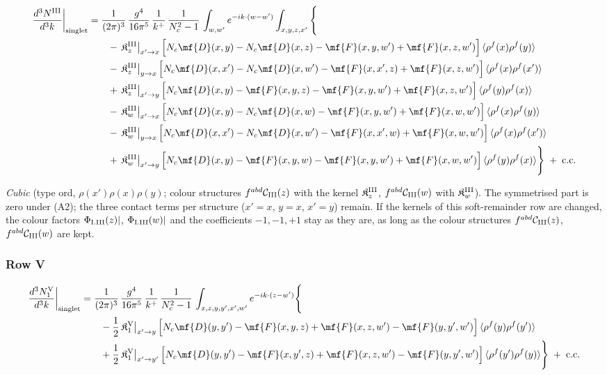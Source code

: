 \begin{align}
\frac{d^{3}N^{\rm III}}{d^{3}k}\bigg|_{\rm singlet}&=\frac{1}{(2\pi)^{3}}\,\frac{g^{4}}{16\pi^{5}}\,\frac{1}{k^{+}}\,\frac{1}{N_{c}^{2}-1}\,\int_{w,w'}e^{-ik\cdot(w-w')}\int_{x,y,z,x'}\Bigg\{\notag\\
&\qquad -\,\mathfrak{K}^{\rm III}_{z}\big|_{x'\to x}\,\Big[N_{c}\mf{D}(x,y)-N_{c}\mf{D}(x,z)-\mf{F}(x,y,w')+\mf{F}(x,z,w')\Big]\,\langle\rho^{f}(x)\rho^{f}(y)\rangle\notag\\
&\qquad -\,\mathfrak{K}^{\rm III}_{z}\big|_{y\to x}\,\Big[N_{c}\mf{D}(x,x')-N_{c}\mf{D}(x,w')-\mf{F}(x,x',z)+\mf{F}(x,z,w')\Big]\,\langle\rho^{f}(x)\rho^{f}(x')\rangle\notag\\
&\qquad +\,\mathfrak{K}^{\rm III}_{z}\big|_{x'\to y}\,\Big[N_{c}\mf{D}(x,y)-\mf{F}(x,y,z)-\mf{F}(x,y,w')+\mf{F}(x,z,w')\Big]\,\langle\rho^{f}(y)\rho^{f}(x)\rangle\notag\\
&\qquad -\,\mathfrak{K}^{\rm III}_{w}\big|_{x'\to x}\,\Big[N_{c}\mf{D}(x,y)-N_{c}\mf{D}(x,w)-\mf{F}(x,y,w')+\mf{F}(x,w,w')\Big]\,\langle\rho^{f}(x)\rho^{f}(y)\rangle\notag\\
&\qquad -\,\mathfrak{K}^{\rm III}_{w}\big|_{y\to x}\,\Big[N_{c}\mf{D}(x,x')-N_{c}\mf{D}(x,w')-\mf{F}(x,x',w)+\mf{F}(x,w,w')\Big]\,\langle\rho^{f}(x)\rho^{f}(x')\rangle\notag\\
&\qquad +\,\mathfrak{K}^{\rm III}_{w}\big|_{x'\to y}\,\Big[N_{c}\mf{D}(x,y)-\mf{F}(x,y,w)-\mf{F}(x,y,w')+\mf{F}(x,w,w')\Big]\,\langle\rho^{f}(y)\rho^{f}(x)\rangle\Bigg\}\;+\;{\rm c.c.}\label{eq:s-I-III}
\end{align}

\emph{Cubic} (type ord, $\rho(x')\rho(x)\rho(y)$; colour structures $f^{abd}\mathcal{C}_{\rm III}(z)$ with the kernel $\mathfrak{K}^{\rm III}_{z}$, $f^{abd}\mathcal{C}_{\rm III}(w)$ with $\mathfrak{K}^{\rm III}_{w}$). The symmetrised part is zero under (A2); the three contact terms per structure ($x'=x$, $y=x$, $x'=y$) remain. If the kernels of this soft-remainder row are changed, the colour factors $\Phi_{\rm I.III}(z)|$, $\Phi_{\rm I.III}(w)|$ and the coefficients $-1,-1,+1$ stay as they are, as long as the colour structures $f^{abd}\mathcal{C}_{\rm III}(z)$, $f^{abd}\mathcal{C}_{\rm III}(w)$ are kept.

\subsubsection*{Row V}

\begin{align}
\frac{d^{3}N_{1}^{\rm V}}{d^{3}k}\bigg|_{\rm singlet}&=\frac{1}{(2\pi)^{3}}\,\frac{g^{4}}{16\pi^{5}}\,\frac{1}{k^{+}}\,\frac{1}{N_{c}^{2}-1}\,\int_{x,z,y,y',x',w'}e^{-ik\cdot(z-w')}\Bigg\{\notag\\
&\qquad -\frac{1}{2}\,\mathfrak{K}^{\rm V}_{1}\big|_{x'\to y}\,\Big[N_{c}\mf{D}(y,y')-\mf{F}(x,y,z)+\mf{F}(x,z,w')-\mf{F}(y,y',w')\Big]\,\langle\rho^{f}(y)\rho^{f}(y')\rangle\notag\\
&\qquad +\frac{1}{2}\,\mathfrak{K}^{\rm V}_{1}\big|_{x'\to y'}\,\Big[N_{c}\mf{D}(y,y')-\mf{F}(x,y',z)+\mf{F}(x,z,w')-\mf{F}(y,y',w')\Big]\,\langle\rho^{f}(y')\rho^{f}(y)\rangle\Bigg\}\;+\;{\rm c.c.}\label{eq:s-I-V-1}
\end{align}

